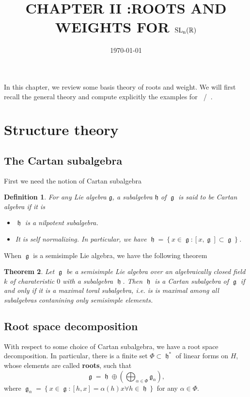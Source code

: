 \documentclass[12pt]{article} %
\title{CHAPTER II :ROOTS AND WEIGHTS FOR $\SLn$} %
\date{\today} %
\newtheorem{definition}{Definition}[section]
\newtheorem{theorem}[definition]{Theorem}
\DeclareMathOperator{\SLn}{\text{SL}_n(\mathbb{R})}
\DeclareMathOperator{\GLn}{\text{GL}_n(\mathbb{R})}
\DeclareMathOperator{\fg}{\mathfrak{g}}
\DeclareMathOperator{\fh}{\mathfrak{h}}
\begin{document}
\maketitle
In this chapter, we review some basis theory of roots and weight. We will first recall the
general theory and compute explicitly the examples for $\SLn$/$\GLn$.
\section{Structure theory}
\subsection{The Cartan subalgebra}
First we need the notion of Cartan subalgebra
\begin{definition}
    For any Lie algebra $\mathfrak{g}$, a subalgebra $\mathfrak{h}$ of $\fg$ is said to be \textit{Cartan algebra} if it is
    \begin{itemize}
        \item $\fh$ is a nilpotent subalgebra.
        \item It is self normalizing. In particular, we have $\fh = \left\lbrace x \in \fg : [x,\fg] \subset \fg\right\rbrace$.
    \end{itemize}
\end{definition}
When $\fg$ is a semisimple Lie algebra, we have the following theorem
\begin{theorem}
    Let $\fg$ be a semisimple Lie algebra over an algebraically closed field $k$ of charateristic $0$ with a subalgebra $\fh$.
    Then $\fh$ is a Cartan subalgebra of $\fg$ if and only if it is a maximal toral subalgebra, i.e. is is maximal among all subalgebras
    contanining only semisimple elements.
\end{theorem}
\subsection{Root space decomposition}
With respect to some choice of Cartan subalgebra, we have a root space decomposition. In particular, there is a finite set
$\Phi \subset \fh^{*}$ of linear forms on $H$, whose elements are called \textbf{roots}, such that
\[\fg = \fh \oplus \left(\bigoplus_{\alpha \in \Phi} \mathfrak{g}_\alpha\right),\]
where $\fg_\alpha = \left\lbrace x \in \fg: [h,x] = \alpha(h)x \forall h \in \fh\right\rbrace$ for any $\alpha \in \Phi$.
\end{document}
